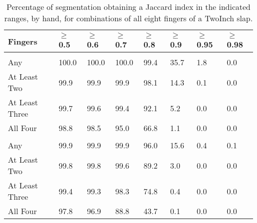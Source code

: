 \documentclass[]{article}
\begin{document}
\begin{table}[!h]

\caption{\label{tab:twoinch-per-hand-all-jaccard}Percentage of segmentation obtaining a Jaccard index in the indicated ranges, by hand, for combinations of all eight fingers of a TwoInch slap.}
\centering
\begin{tabular}{llllllll}
\toprule
Fingers & $\ge$0.5 & $\ge$0.6 & $\ge$0.7 & $\ge$0.8 & $\ge$0.9 & $\ge$0.95 & $\ge$0.98\\
\midrule
\addlinespace[0.3em]
\multicolumn{8}{l}{\textbf{Right}}\\
\rowcolor{gray!6}  \hspace{1em}Any & 100.0 & 100.0 & 100.0 & 99.4 & 35.7 & 1.8 & 0.0\\
\hspace{1em}At Least Two & 99.9 & 99.9 & 99.9 & 98.1 & 14.3 & 0.1 & 0.0\\
\rowcolor{gray!6}  \hspace{1em}At Least Three & 99.7 & 99.6 & 99.4 & 92.1 & 5.2 & 0.0 & 0.0\\
\hspace{1em}All Four & 98.8 & 98.5 & 95.0 & 66.8 & 1.1 & 0.0 & 0.0\\
\addlinespace[0.3em]
\multicolumn{8}{l}{\textbf{Left}}\\
\rowcolor{gray!6}  \hspace{1em}Any & 99.9 & 99.9 & 99.9 & 96.0 & 15.6 & 0.4 & 0.1\\
\hspace{1em}At Least Two & 99.8 & 99.8 & 99.6 & 89.2 & 3.0 & 0.0 & 0.0\\
\rowcolor{gray!6}  \hspace{1em}At Least Three & 99.4 & 99.3 & 98.3 & 74.8 & 0.4 & 0.0 & 0.0\\
\hspace{1em}All Four & 97.8 & 96.9 & 88.8 & 43.7 & 0.1 & 0.0 & 0.0\\
\bottomrule
\end{tabular}
\end{table}
\end{document}
